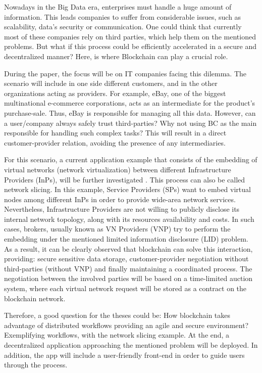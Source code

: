 Nowadays in the Big Data era, enterprises must handle a huge amount of information. This leads companies to suffer from considerable issues, such as scalability, data's security or communication. One could think that currently most of these companies rely on third parties, which help them on the mentioned problems. But what if this process could be efficiently accelerated in a secure and decentralized manner? Here, is where Blockchain can play a crucial role.

During the paper, the focus will be on IT companies facing this dilemma. The scenario will include in one side different customers, and in the other organizations acting as providers. For example, eBay, one of the biggest multinational e-commerce corporations, acts as an intermediate for the product's purchase-sale. Thus, eBay is responsible for managing all this data. However, can a user/company always safely trust third-parties? Why not using BC as the main responsible for handling such complex tasks? This will result in a direct customer-provider relation, avoiding the presence of any intermediaries.

For this scenario, a current application example that consists of the embedding of virtual networks (network virtualization) between different Infrastructure Providers (InPs), will be further investigated \cite{dietrich2015multi}. This process can also be called network slicing. In this example, Service Providers (SPs) want to embed virtual nodes among different InPs in order to provide wide-area network services. Nevertheless, Infrastructure Providers are not willing to publicly disclose its internal network topology, along with its resources availability and costs. In such cases, brokers, usually known as VN Providers (VNP) try to perform the embedding under the mentioned limited information disclosure (LID) problem. As a result, it can be clearly observed that blockchain can solve this interaction, providing: secure sensitive data storage, customer-provider negotiation without third-parties (without VNP) and finally maintaining a coordinated process. The negotiation between the involved parties will be based on a time-limited auction system, where each virtual network request will be stored as a contract on the blockchain network.

Therefore, a good question for the theses could be: How blockchain takes advantage of distributed workflows providing an agile and secure environment? Exemplifying workflows, with the network slicing example. At the end, a decentralized application approaching the mentioned problem will be deployed. In addition, the app will include a user-friendly front-end in order to guide users through the process. 


